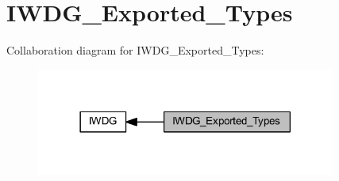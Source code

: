 \hypertarget{group___i_w_d_g___exported___types}{}\section{I\+W\+D\+G\+\_\+\+Exported\+\_\+\+Types}
\label{group___i_w_d_g___exported___types}
Collaboration diagram for I\+W\+D\+G\+\_\+\+Exported\+\_\+\+Types\+:
\nopagebreak
\begin{figure}[H]
\begin{center}
\leavevmode
\includegraphics[width=278pt]{group___i_w_d_g___exported___types}
\end{center}
\end{figure}
